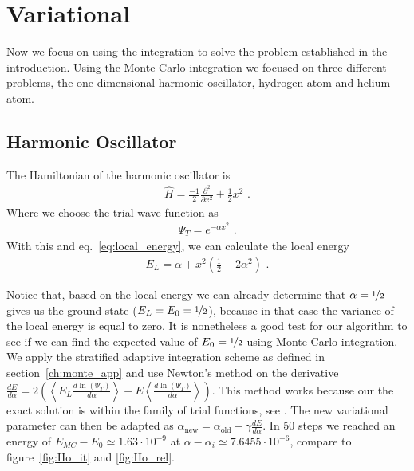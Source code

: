 
\section{Variational}
Now we focus on using the integration to solve the problem established in the introduction.
Using the Monte Carlo integration we focused on three different problems, the one-dimensional harmonic oscillator, hydrogen atom and helium atom.

\subsection{Harmonic Oscillator}
The Hamiltonian of the harmonic oscillator is
\begin{align*}
  \hat{H} = \frac{-1}{2}\frac{\partial^2}{ \partial x^2} + \frac{1}{2} x^2  \text{~.}
\end{align*}
Where we choose the trial wave function as
  \begin{align*}
    \Psi_T = e^{-\alpha x^2} \text{~.}
  \end{align*}
With this and eq.~\eqref{eq:local_energy}, we can calculate the local energy
  \begin{align*}
    E_L = \alpha + x^2 \left(\frac{1}{2} - 2\alpha^2\right) \text{~.}
  \end{align*}
 	
Notice that, based on the local energy we can already determine that $\alpha = \nicefrac{1}{2}$ gives us the ground state ($E_L = E_0 = \nicefrac{1}{2}$), because in that case the variance of the local energy is equal to zero. It is nonetheless a good test for our algorithm to see if we can find the expected value of $E_0 = \nicefrac{1}{2}$ using Monte Carlo integration.\\
  
We apply the stratified adaptive integration scheme as defined in section~\ref{ch:monte_app} and use Newton's method on the derivative $\frac{dE}{d\alpha} = 2 (\left< E_L \frac{d \ln(\Psi_T)}{d \alpha} \right> - E\left<\frac{d \ln(\Psi_T)}{d \alpha}\right>)$. This method works because our the exact solution is within the family of trial functions, see \cite{JosBook}. %
The new variational parameter can then be adapted as $\alpha_{\text{new}} = \alpha_{\text{old}} - \gamma \frac{dE}{d\alpha} $.
In 50 steps we reached an energy of $E_{MC}-E_0 \simeq 1.63\cdot 10^{-9}$ at $\alpha - \alpha_i \simeq 7.6455\cdot 10^{-6}$, compare to figure~\ref{fig:Ho_it} and \ref{fig:Ho_rel}.

